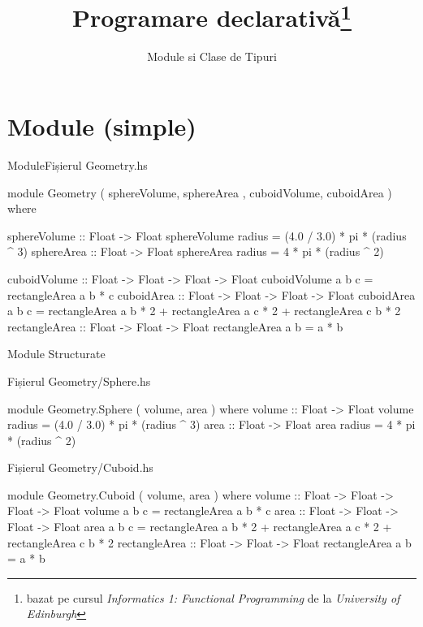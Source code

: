 \documentclass[handout,xcolor=pdftex,romanian,colorlinks]{beamer}
\title[PD---Module si Tipuri]{Programare declarativă\thanks{bazat pe cursul \emph{Informatics 1: Functional Programming} de la \emph{University of Edinburgh}}}
\subtitle{Module si Clase de Tipuri}
\begin{document}
\begin{frame}
  \titlepage
\end{frame}

\section{Module (simple)}

\begin{frame}[fragile]{Module}{Fișierul Geometry.hs}
\begin{asciihs}
module Geometry 
( sphereVolume, sphereArea  
, cuboidVolume, cuboidArea
) where  
      
sphereVolume :: Float -> Float  
sphereVolume radius = (4.0 / 3.0) * pi * (radius ^ 3)  
sphereArea :: Float -> Float  
sphereArea radius = 4 * pi * (radius ^ 2)  

cuboidVolume :: Float -> Float -> Float -> Float  
cuboidVolume a b c = rectangleArea a b * c  
cuboidArea :: Float -> Float -> Float -> Float  
cuboidArea a b c = rectangleArea a b * 2 +
    rectangleArea a c * 2 + rectangleArea c b * 2  
rectangleArea :: Float -> Float -> Float  
rectangleArea a b = a * b  
\end{asciihs}
\end{frame}


\begin{frame}[fragile]{Module Structurate}
\begin{block}
{Fișierul Geometry/Sphere.hs}
\vspace{-2ex}
\begin{asciihs}
module Geometry.Sphere ( volume, area ) where  
volume :: Float -> Float  
volume radius = (4.0 / 3.0) * pi * (radius ^ 3)  
area :: Float -> Float  
area radius = 4 * pi * (radius ^ 2)  
\end{asciihs}
\end{block}
\begin{block}
{Fișierul Geometry/Cuboid.hs}
\vspace{-2ex}
\begin{asciihs}
module Geometry.Cuboid ( volume, area ) where  
volume :: Float -> Float -> Float -> Float  
volume a b c = rectangleArea a b * c  
area :: Float -> Float -> Float -> Float  
area a b c = rectangleArea a b * 2 +
    rectangleArea a c * 2 + rectangleArea c b * 2  
rectangleArea :: Float -> Float -> Float  
rectangleArea a b = a * b  
\end{asciihs}
\end{block}
\end{frame}
\end{document}
